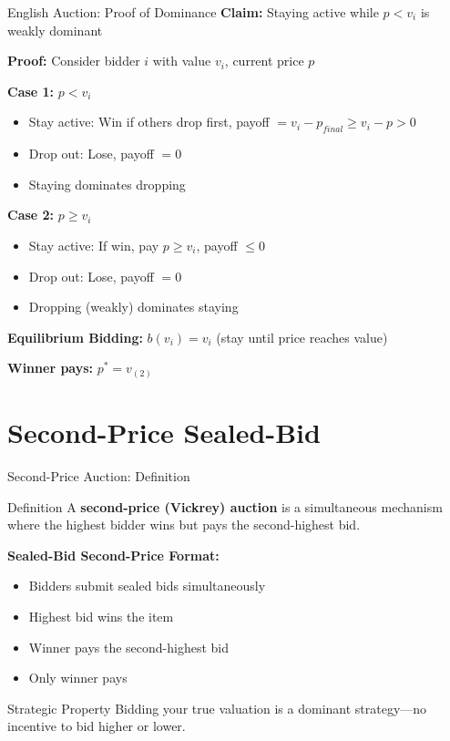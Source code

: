 \documentclass[xcolor={x11names}, aspectratio=169 ]{beamer}
\begin{document}
\begin{frame}{English Auction: Proof of Dominance}
\textbf{Claim:} Staying active while $p < v_i$ is weakly dominant

\textbf{Proof:} Consider bidder $i$ with value $v_i$, current price $p$

\textbf{Case 1:} $p < v_i$
\begin{itemize}
  \item Stay active: Win if others drop first, payoff $= v_i - p_{final} \geq v_i - p > 0$
  \item Drop out: Lose, payoff $= 0$
  \item Staying dominates dropping
\end{itemize}

\textbf{Case 2:} $p \geq v_i$
\begin{itemize}
  \item Stay active: If win, pay $p \geq v_i$, payoff $\leq 0$
  \item Drop out: Lose, payoff $= 0$
  \item Dropping (weakly) dominates staying
\end{itemize}

\textbf{Equilibrium Bidding:} $b(v_i) = v_i$ (stay until price reaches value)

\textbf{Winner pays:} $p^* = v_{(2)}$
\end{frame}

\section{Second-Price Sealed-Bid}

\begin{frame}{Second-Price Auction: Definition}
\begin{block}{Definition}
A \textbf{second-price (Vickrey) auction} is a simultaneous mechanism where the highest bidder wins but pays the second-highest bid.
\end{block}

\textbf{Sealed-Bid Second-Price Format:}
\begin{itemize}
\item Bidders submit sealed bids simultaneously
\item Highest bid wins the item
\item Winner pays the second-highest bid
\item Only winner pays
\end{itemize}

\begin{alertblock}{Strategic Property}
Bidding your true valuation is a dominant strategy—no incentive to bid higher or lower.
\end{alertblock}
\end{frame}
\end{document}

